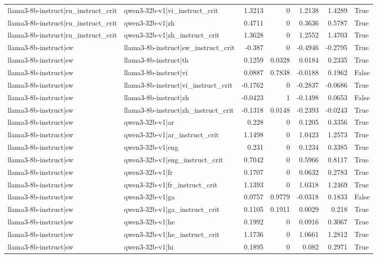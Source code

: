 \begin{table}
\begin{tabular}{l l r r r r l}
llama3-8b-instruct|ru_instruct_crit & qwen3-32b-v1|vi_instruct_crit & 1.3213 & 0 & 1.2138 & 1.4289 & True \\
llama3-8b-instruct|ru_instruct_crit & qwen3-32b-v1|zh & 0.4711 & 0 & 0.3636 & 0.5787 & True \\
llama3-8b-instruct|ru_instruct_crit & qwen3-32b-v1|zh_instruct_crit & 1.3628 & 0 & 1.2552 & 1.4703 & True \\
llama3-8b-instruct|sw & llama3-8b-instruct|sw_instruct_crit & -0.387 & 0 & -0.4946 & -0.2795 & True \\
llama3-8b-instruct|sw & llama3-8b-instruct|th & 0.1259 & 0.0328 & 0.0184 & 0.2335 & True \\
llama3-8b-instruct|sw & llama3-8b-instruct|vi & 0.0887 & 0.7838 & -0.0188 & 0.1962 & False \\
llama3-8b-instruct|sw & llama3-8b-instruct|vi_instruct_crit & -0.1762 & 0 & -0.2837 & -0.0686 & True \\
llama3-8b-instruct|sw & llama3-8b-instruct|zh & -0.0423 & 1 & -0.1498 & 0.0653 & False \\
llama3-8b-instruct|sw & llama3-8b-instruct|zh_instruct_crit & -0.1318 & 0.0148 & -0.2393 & -0.0243 & True \\
llama3-8b-instruct|sw & qwen3-32b-v1|ar & 0.228 & 0 & 0.1205 & 0.3356 & True \\
llama3-8b-instruct|sw & qwen3-32b-v1|ar_instruct_crit & 1.1498 & 0 & 1.0423 & 1.2573 & True \\
llama3-8b-instruct|sw & qwen3-32b-v1|eng & 0.231 & 0 & 0.1234 & 0.3385 & True \\
llama3-8b-instruct|sw & qwen3-32b-v1|eng_instruct_crit & 0.7042 & 0 & 0.5966 & 0.8117 & True \\
llama3-8b-instruct|sw & qwen3-32b-v1|fr & 0.1707 & 0 & 0.0632 & 0.2783 & True \\
llama3-8b-instruct|sw & qwen3-32b-v1|fr_instruct_crit & 1.1393 & 0 & 1.0318 & 1.2469 & True \\
llama3-8b-instruct|sw & qwen3-32b-v1|ga & 0.0757 & 0.9779 & -0.0318 & 0.1833 & False \\
llama3-8b-instruct|sw & qwen3-32b-v1|ga_instruct_crit & 0.1105 & 0.1911 & 0.0029 & 0.218 & True \\
llama3-8b-instruct|sw & qwen3-32b-v1|he & 0.1992 & 0 & 0.0916 & 0.3067 & True \\
llama3-8b-instruct|sw & qwen3-32b-v1|he_instruct_crit & 1.1736 & 0 & 1.0661 & 1.2812 & True \\
llama3-8b-instruct|sw & qwen3-32b-v1|hi & 0.1895 & 0 & 0.082 & 0.2971 & True \\

\end{tabular}
\end{table}
